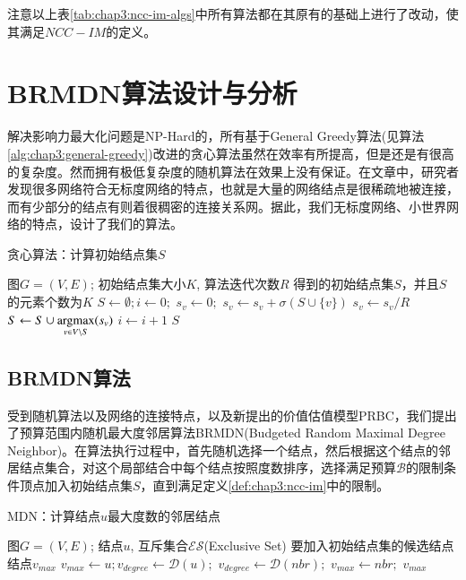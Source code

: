 注意以上表\ref{tab:chap3:ncc-im-algs}中所有算法都在其原有的基础上进行了改动，使其满足$NCC-IM$的定义。


\section{BRMDN算法设计与分析}
解决影响力最大化问题是NP-Hard的，所有基于General Greedy算法(见算法\ref{alg:chap3:general-greedy})改进的贪心算法虽然在效率有所提高，但是还是有很高的复杂度。然而拥有极低复杂度的随机算法在效果上没有保证。在文章\cite{barabasi1999emergence}\cite{adamic2000power}\cite{watts1998collective}中，研究者发现很多网络符合无标度网络的特点，也就是大量的网络结点是很稀疏地被连接，而有少部分的结点有则着很稠密的连接关系网。据此，我们无标度网络、小世界网络的特点，设计了我们的算法。

\begin{algorithm}
\caption{贪心算法：计算初始结点集$S$}
\label{alg:chap3:general-greedy}
\begin{algorithmic}
\REQUIRE 图$G=(V,E)$; 初始结点集大小$K$, 算法迭代次数$R$
\ENSURE 得到的初始结点集$S$，并且$S$的元素个数为$K$
\STATE $S \leftarrow \emptyset; i \leftarrow 0;$
		\STATE $s_{v} \leftarrow 0;$
			\STATE $s_{v} \leftarrow s_{v} + \sigma(S \cup \{v\})$
		\ENDFOR
		\STATE $s_{v} \leftarrow s_{v}/R$
	\ENDFOR
	\STATE $S \leftarrow S \cup \mathop{\rm argmax} \limits_{v \in V \setminus S}(s_{v})$
	\STATE $i \leftarrow i + 1$
\ENDWHILE
\RETURN $S$
\end{algorithmic}
\end{algorithm}


\subsection{BRMDN算法}
受到随机算法以及网络的连接特点，以及新提出的价值估值模型PRBC，我们提出了预算范围内随机最大度邻居算法BRMDN(Budgeted Random Maximal Degree Neighbor)。在算法执行过程中，首先随机选择一个结点，然后根据这个结点的邻居结点集合，对这个局部结合中每个结点按照度数排序，选择满足预算$\mathcal{B}$的限制条件顶点加入初始结点集$S$，直到满足定义\ref{def:chap3:ncc-im}中的限制。


\begin{algorithm}
\caption{MDN：计算结点$u$最大度数的邻居结点}
\label{alg:chap3:mdn-alg}
\begin{algorithmic}
\REQUIRE 图$G=(V,E)$; 结点$u$, 互斥集合$\mathcal{ES}$(Exclusive Set)
\ENSURE 要加入初始结点集的候选结点结点$v_{max}$
\STATE $v_{max} \leftarrow u; v_{degree} \leftarrow \mathcal{D}(u);$
		\STATE $v_{degree} \leftarrow \mathcal{D}(nbr);$
		\STATE $v_{max} \leftarrow nbr;$
	\ENDIF
\ENDFOR
\RETURN $v_{max}$
\end{algorithmic}
\end{algorithm}


